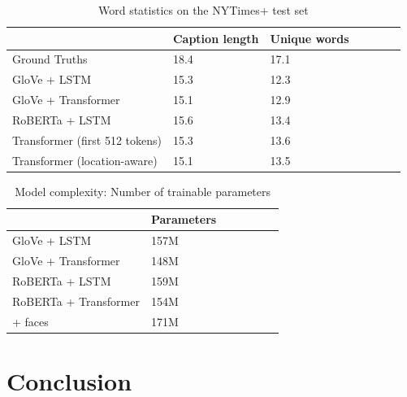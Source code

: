 \documentclass[10pt,twocolumn,letterpaper]{article}
\begin{document}
\begin{table}[t]
	\caption {Word statistics on the NYTimes+ test set}
	\label{tab:results-stats}
	\centering
	\begin{tabular}{lllllll}
		\toprule
        & Caption length  & Unique words \\
      \midrule
      Ground Truths & 18.4 & 17.1 \\
      GloVe + LSTM  & 15.3 & 12.3 \\
      GloVe + Transformer  & 15.1 & 12.9 \\
      RoBERTa + LSTM  & 15.6 & 13.4 \\
      Transformer (first 512 tokens)  & 15.3 & 13.6 \\
      Transformer (location-aware) & 15.1 & 13.5  \\
		\bottomrule
	\end{tabular}
\end{table}


\begin{table}[t]
	\caption {Model complexity: Number of trainable parameters}
	\label{tab:models}
	\centering
	\begin{tabular}{lllllll}
		\toprule
        & Parameters \\
      \midrule
      GloVe + LSTM & 157M \\
      GloVe + Transformer & 148M \\
      RoBERTa + LSTM & 159M \\
      RoBERTa + Transformer & 154M \\
        + faces & 171M \\
		\bottomrule
	\end{tabular}
\end{table}

\section{Conclusion}

{\small


}
\end{document}
